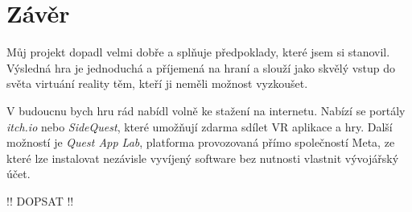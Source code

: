 \chapter*{Závěr}

Můj projekt dopadl velmi dobře a splňuje předpoklady, které jsem si stanovil. Výsledná hra je jednoduchá a příjemená na hraní a slouží jako skvělý vstup do světa virtuání reality těm, kteří ji neměli možnost vyzkoušet.

V budoucnu bych hru rád nabídl volně ke stažení na internetu. Nabízí se portály \textit{itch.io} nebo \textit{SideQuest}, které umožňují zdarma sdílet VR aplikace a hry. Další možností je \textit{Quest App Lab}, platforma provozovaná přímo společností Meta, ze které lze instalovat nezávisle vyvíjený software bez nutnosti vlastnit vývojářský účet.

!! DOPSAT !!